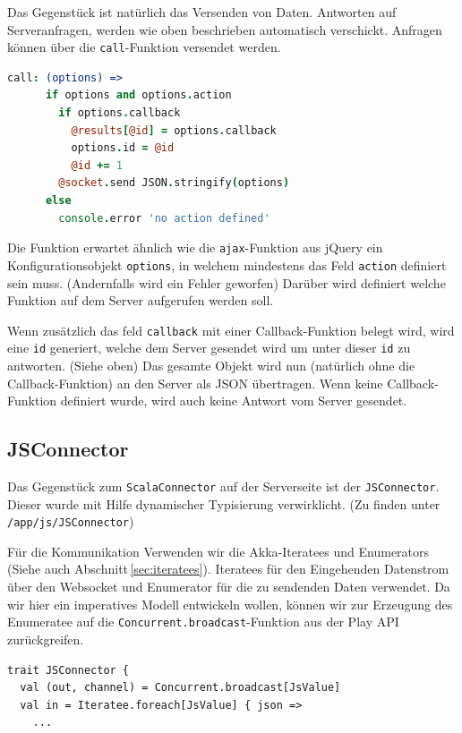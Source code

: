 Das Gegenstück ist natürlich das Versenden von Daten. Antworten auf Serveranfragen, werden wie oben
beschrieben automatisch verschickt. Anfragen können über die \texttt{call}-Funktion versendet
werden.

\begin{lstlisting}[language=coffee] 
    call: (options) =>      
      if options and options.action        
        if options.callback
          @results[@id] = options.callback
          options.id = @id
          @id += 1
        @socket.send JSON.stringify(options)
      else
        console.error 'no action defined'
\end{lstlisting}

Die Funktion erwartet ähnlich wie die \texttt{ajax}-Funktion aus jQuery ein Konfigurationsobjekt
\texttt{options}, in welchem mindestens das Feld \texttt{action} definiert sein muss. (Andernfalls
wird ein Fehler geworfen) Darüber wird definiert welche Funktion auf dem Server aufgerufen werden
soll.

Wenn zusätzlich das feld \texttt{callback} mit einer Callback-Funktion belegt wird, wird eine
\texttt{id} generiert, welche dem Server gesendet wird um unter dieser \texttt{id} zu antworten.
(Siehe oben) Das gesamte Objekt wird nun (natürlich ohne die Callback-Funktion) an den Server als
JSON übertragen. Wenn keine Callback-Funktion definiert wurde, wird auch keine Antwort vom Server
gesendet.

\subsection{JSConnector}

Das Gegenstück zum \texttt{ScalaConnector} auf der Serverseite ist der \texttt{JSConnector}. Dieser
wurde mit Hilfe dynamischer Typisierung verwirklicht. (Zu finden unter \texttt{/app/js/JSConnector})

Für die Kommunikation Verwenden wir die Akka-Iteratees und Enumerators (Siehe auch
Abschnitt\,\ref{sec:iteratees}). Iteratees für den Eingehenden Datenstrom über den Websocket und
Enumerator für die zu sendenden Daten verwendet. Da wir hier ein imperatives Modell entwickeln
wollen, können wir zur Erzeugung des Enumeratee auf die \texttt{Concurrent.broadcast}-Funktion aus
der Play API zurückgreifen.

\begin{lstlisting}
trait JSConnector {
  val (out, channel) = Concurrent.broadcast[JsValue]
  val in = Iteratee.foreach[JsValue] { json =>
    ...
\end{lstlisting}

